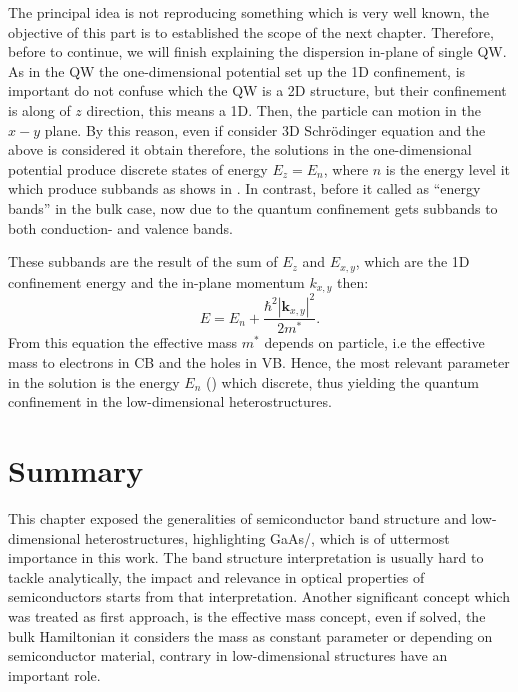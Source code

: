 The principal idea is not reproducing something which is very well known, the objective of this part is to established the scope of the next chapter. Therefore,  before to continue, we will finish explaining the dispersion in-plane of single \gls{QW}. As in the \gls{QW} the one-dimensional potential set up the 1D confinement, is important do not confuse which the \gls{QW} is a 2D structure, but their confinement is along of $z$ direction, this means a 1D. Then, the particle can motion in the $x-y$ plane. By this reason, even if consider 3D Schrödinger equation and  the above is considered it obtain 
therefore, the solutions in the one-dimensional potential produce discrete states of energy $E_{z}=E_{n}$\cite{harrison2016quantum}, where $n$ is the energy level it which produce subbands as shows in . In contrast, before it called as ``energy bands'' in the bulk case, now due to the quantum confinement gets subbands to both conduction- and valence bands.

These subbands are the result of the sum of $E_{z}$ and $E_{x,y}$, which are the 1D confinement energy and the in-plane momentum $k_{x,y}$ then\cite{harrison2016quantum}:
\begin{equation}\label{eqn:chapter-1-total-enery-ema-aprox}		
	E = E_{n} + \dfrac{\hbar^{2}|\boldsymbol{k}_{x,y}|^{2}}{2m^{*}}.
\end{equation}  
From this equation the effective mass  $m^*$ depends on particle, i.e the effective mass to electrons in CB and the holes in VB. Hence, the most relevant parameter in the solution is the energy $E_{n}$ () which discrete, thus yielding the quantum confinement in the low-dimensional
heterostructures.
\section{Summary}
\vspace{-10mm} 
This chapter exposed the generalities of semiconductor band structure and low-dimensional
heterostructures, highlighting GaAs/\algaas, which is of uttermost importance in this work. The band structure interpretation
is usually hard to tackle analytically, the impact and relevance in optical properties of semiconductors starts from that interpretation. Another significant concept which was treated as first approach, is the effective mass concept, even if solved, the bulk Hamiltonian it considers the mass as constant parameter or depending on semiconductor
material, contrary in low-dimensional structures have an important role.

